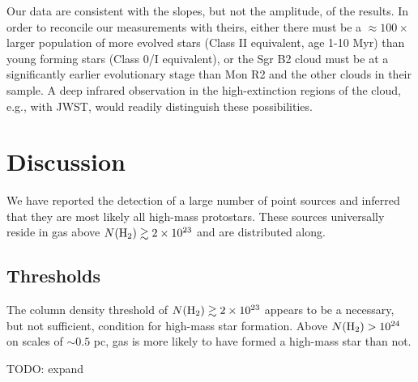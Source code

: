 \documentclass[twocolumn]{aastex61}
\begin{document}
Our data are consistent with the slopes, but not the amplitude, of the
\citet{Gutermuth2011a} results.  In order to reconcile our measurements with
theirs, either there must be a $\approx100\times$ larger population of more
evolved stars (Class II equivalent, age 1-10 Myr) than young forming stars
(Class 0/I equivalent), or the Sgr B2 cloud must be at a significantly earlier
evolutionary stage than Mon R2 and the other clouds in their sample.
A deep infrared observation in the high-extinction regions of the cloud,
e.g., with JWST, would readily distinguish these possibilities.



\section{Discussion}
\label{sec:discussion}
We have reported the detection of a large number of point sources and inferred
that they are most likely all high-mass protostars.  These sources universally
reside in gas above $N(\textrm{H}_{2})\gtrsim2\times10^{23}$ \persc and are distributed along.

\subsection{Thresholds}
The column density threshold of $N(\textrm{H}_{2})\gtrsim2\times10^{23}$ \persc appears
to be a necessary, but not sufficient, condition for high-mass star formation.  
Above $N(\textrm{H}_{2})>10^{24}$ \persc on scales of $\sim0.5$ pc, gas is more likely to
have formed a high-mass star than not.

{\color{red}
TODO: expand
}




\end{document}
